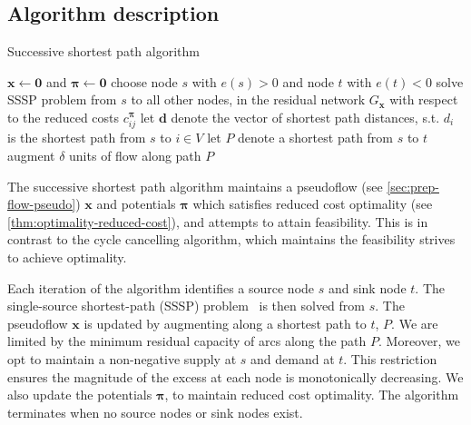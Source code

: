 \subsection{Algorithm description}

\begin{algorithm}
    \caption{Successive shortest path algorithm}
    \label{algo:successive-shortest-path}
    \begin{algorithmic}[1]
        \State $\mathbf{x} \gets \mathbf{0}$ and $\boldsymbol{\pi} \gets \mathbf{0}$
          \State choose node $s$ with $e(s) > 0$ and node $t$ with $e(t) < 0$\footnotemark
          \State solve SSSP problem from $s$ to all other nodes, in the residual network $G_{\mathbf{x}}$ with respect to the reduced costs $c^{\boldsymbol{\pi}}_{ij}$
          \State let $\mathbf{d}$ denote the vector of shortest path distances, s.t. $d_i$ is the shortest path from $s$ to $i\in V$
          \State let $P$ denote a shortest path from $s$ to $t$
          \State augment $\delta$ units of flow along path $P$
        \EndWhile
    \end{algorithmic}
\end{algorithm}


The successive shortest path algorithm maintains a pseudoflow (see \cref{sec:prep-flow-pseudo}) $\mathbf{x}$ and potentials $\boldsymbol{\pi}$ which satisfies reduced cost optimality (see \cref{thm:optimality-reduced-cost}), and attempts to attain feasibility. This is in contrast to the cycle cancelling algorithm, which maintains the feasibility strives to achieve optimality.

Each iteration of the algorithm identifies a source node $s$ and sink node $t$. The single-source shortest-path (SSSP) problem~\cite[ch.~24]{CLRS:2009} is then solved from $s$. The pseudoflow $\mathbf{x}$ is updated by augmenting along a shortest path to $t$, $P$. We are limited by the minimum residual capacity of arcs along the path $P$. Moreover, we opt to maintain a non-negative supply at $s$ and demand at $t$. This restriction ensures the magnitude of the excess at each node is monotonically decreasing. We also update the potentials $\boldsymbol{\pi}$, to maintain reduced cost optimality. The algorithm terminates when no source nodes or sink nodes exist.

